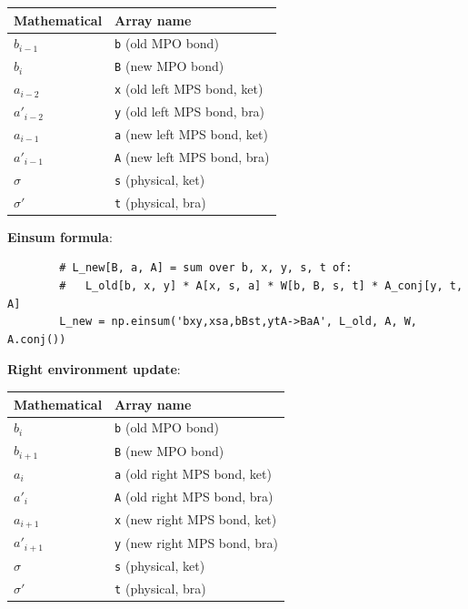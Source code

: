 \documentclass[aps,prb,onecolumn,scriptaddress]{revtex4-2}
\begin{document}
		\begin{center}
		\begin{tabular}{ll}
			\toprule
			\textbf{Mathematical} & \textbf{Array name} \\
			\midrule
			$b_{i-1}$ & \texttt{b} (old MPO bond) \\
			$b_i$ & \texttt{B} (new MPO bond) \\
			$a_{i-2}$ & \texttt{x} (old left MPS bond, ket) \\
			$a'_{i-2}$ & \texttt{y} (old left MPS bond, bra) \\
			$a_{i-1}$ & \texttt{a} (new left MPS bond, ket) \\
			$a'_{i-1}$ & \texttt{A} (new left MPS bond, bra) \\
			$\sigma$ & \texttt{s} (physical, ket) \\
			$\sigma'$ & \texttt{t} (physical, bra) \\
			\bottomrule
		\end{tabular}
		\end{center}
		
		\textbf{Einsum formula}:
		\begin{verbatim}
		# L_new[B, a, A] = sum over b, x, y, s, t of:
		#   L_old[b, x, y] * A[x, s, a] * W[b, B, s, t] * A_conj[y, t, A]
		L_new = np.einsum('bxy,xsa,bBst,ytA->BaA', L_old, A, W, A.conj())
		\end{verbatim}
		
		\textbf{Right environment update}:
		
		\begin{center}
		\begin{tabular}{ll}
			\toprule
			\textbf{Mathematical} & \textbf{Array name} \\
			\midrule
			$b_i$ & \texttt{b} (old MPO bond) \\
			$b_{i+1}$ & \texttt{B} (new MPO bond) \\
			$a_i$ & \texttt{a} (old right MPS bond, ket) \\
			$a'_i$ & \texttt{A} (old right MPS bond, bra) \\
			$a_{i+1}$ & \texttt{x} (new right MPS bond, ket) \\
			$a'_{i+1}$ & \texttt{y} (new right MPS bond, bra) \\
			$\sigma$ & \texttt{s} (physical, ket) \\
			$\sigma'$ & \texttt{t} (physical, bra) \\
			\bottomrule
		\end{tabular}
		\end{center}
		
\end{document}
